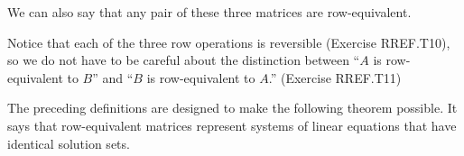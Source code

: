 \documentclass[openany]{book}
\begin{document}
We can also say that any pair of these three matrices are
row-equivalent.

Notice that each of the three row operations is reversible ({Exercise
RREF.T10}), so we do not have to be careful about the distinction
between ``\(A\) is row-equivalent to \(B\)'' and ``\(B\) is
row-equivalent to \(A\).'' ({Exercise RREF.T11})

The preceding definitions are designed to make the following theorem
possible. It says that row-equivalent matrices represent systems of
linear equations that have identical solution sets.
\end{document}
